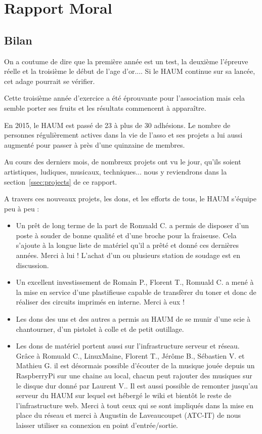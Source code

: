 \documentclass[11pt]{article}
\begin{document}


\section{Rapport Moral}


\subsection{Bilan}

On a coutume de dire que la première année est un test, la deuxième l'épreuve réelle et la troisième le début de l'age
d'or.... Si le HAUM continue sur sa lancée, cet adage pourrait se vérifier.

Cette troisième année d'exercice a été éprouvante pour l'association mais cela semble porter ses fruits et les résultats
commencent à apparaître.

En 2015, le HAUM est passé de 23 à plus de 30 adhésions. Le nombre de personnes régulièrement actives dans la vie de l'asso
et ses projets a lui aussi augmenté pour passer à près d'une quinzaine de membres.

Au cours des derniers mois, de nombreux projets ont vu le jour, qu'ils soient artistiques, ludiques, musicaux,
techniques... nous y reviendrons dans la section~\ref{ssec:projects} de ce rapport.

A travers ces nouveaux projets, les dons, et les efforts de tous, le HAUM s'équipe peu à peu :

\begin{itemize}
	\item Un prêt de long terme de la part de Romuald C. a permis de disposer d'un poste à souder de bonne qualité et
		d'une broche pour la fraiseuse. Cela s'ajoute à la longue liste de matériel qu'il a prêté et donné ces dernières
		années. Merci à lui ! L'achat d'un ou plusieurs station de soudage est en discussion.
	\item Un excellent investissement de Romain P., Florent T., Romuald C. a mené à la mise en service d'une plastifieuse
		capable de transfèrer du toner et donc de réaliser des circuits imprimés en interne. Merci à eux !
	\item Les dons des uns et des autres a permis au HAUM de se munir d'une scie à chantourner, d'un pistolet à colle et
		de petit outillage.
	\item Les dons de matériel portent aussi sur l'infrastructure serveur et réseau. Grâce à Romuald C., LinuxMaine,
		Florent T., Jérôme B., Sébastien V. et Mathieu G. il est désormais possible d'écouter de la musique jouée depuis un
		RaspberryPi sur une chaine au local, chacun peut rajouter des musiques sur le disque dur donné par Laurent
		V.. Il est aussi possible de remonter jusqu'au serveur du HAUM sur lequel est hébergé le wiki et bientôt le
		reste de l'infrastructure web. Merci à tout ceux qui se sont impliqués dans la mise en place du réseau et merci
		à Augustin de Laveaucoupet (ATC-IT) de nous laisser utiliser sa connexion en point d'entrée/sortie.
\end{itemize}
\end{document}
